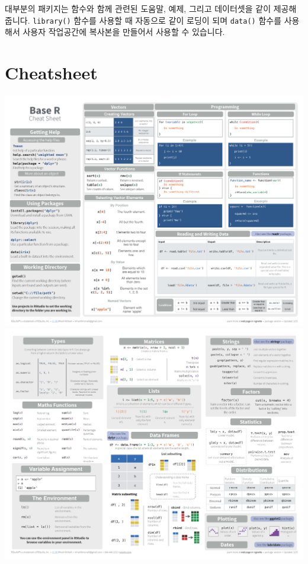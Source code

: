 \documentclass[
]{book}
\newenvironment{Shaded}{\begin{snugshade}}{\end{snugshade}}
\newcommand{\AttributeTok}[1]{\textcolor[rgb]{0.77,0.63,0.00}{#1}}
\newcommand{\FunctionTok}[1]{\textcolor[rgb]{0.00,0.00,0.00}{#1}}
\newcommand{\NormalTok}[1]{#1}
\newcommand{\SpecialCharTok}[1]{\textcolor[rgb]{0.00,0.00,0.00}{#1}}
\newcommand{\StringTok}[1]{\textcolor[rgb]{0.31,0.60,0.02}{#1}}
\begin{document}
대부분의 패키지는 함수와 함께 관련된 도움말, 예제, 그리고 데이터셋을 같이 제공해 줍니다. \texttt{library()} 함수를 사용할 때 자동으로 같이 로딩이 되며 \texttt{data()} 함수를 사용해서 사용자 작업공간에 복사본을 만들어서 사용할 수 있습니다.

\begin{Shaded}
\end{Shaded}

\hypertarget{cheatsheet}{%
\section{Cheatsheet}\label{cheatsheet}}

\includegraphics{images/01/base-r_1.png}
\includegraphics{images/01/base-r_2.png}
\end{document}
